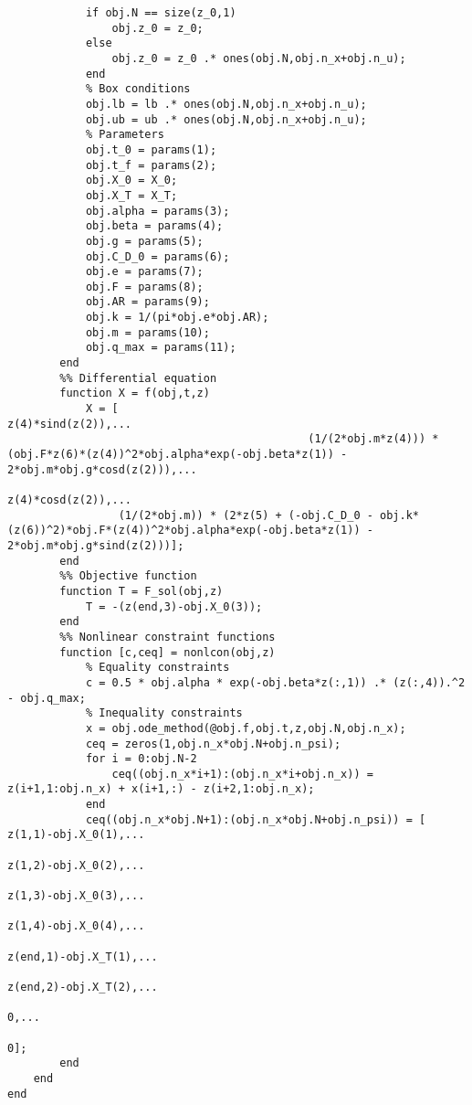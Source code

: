 \begin{lstlisting}[style=num_octave, caption={Matlab Programmcode von \texttt{maximalrangeflight.m}.}, label=code:direct_maximalrangeflight]
            % Start vector fmincon
            if obj.N == size(z_0,1)
                obj.z_0 = z_0;
            else
                obj.z_0 = z_0 .* ones(obj.N,obj.n_x+obj.n_u);
            end
            % Box conditions
            obj.lb = lb .* ones(obj.N,obj.n_x+obj.n_u);
            obj.ub = ub .* ones(obj.N,obj.n_x+obj.n_u);
            % Parameters
            obj.t_0 = params(1);
            obj.t_f = params(2);
            obj.X_0 = X_0;
            obj.X_T = X_T;
            obj.alpha = params(3);
            obj.beta = params(4);
            obj.g = params(5);
            obj.C_D_0 = params(6);
            obj.e = params(7);
            obj.F = params(8);
            obj.AR = params(9);
            obj.k = 1/(pi*obj.e*obj.AR);
            obj.m = params(10);
            obj.q_max = params(11);
        end
        %% Differential equation
        function X = f(obj,t,z)
            X = [                                                                                                                 z(4)*sind(z(2)),...
                                              (1/(2*obj.m*z(4))) * (obj.F*z(6)*(z(4))^2*obj.alpha*exp(-obj.beta*z(1)) - 2*obj.m*obj.g*cosd(z(2))),...
                                                                                                                                  z(4)*cosd(z(2)),...
                 (1/(2*obj.m)) * (2*z(5) + (-obj.C_D_0 - obj.k*(z(6))^2)*obj.F*(z(4))^2*obj.alpha*exp(-obj.beta*z(1)) - 2*obj.m*obj.g*sind(z(2)))];
        end
        %% Objective function
        function T = F_sol(obj,z)
            T = -(z(end,3)-obj.X_0(3));
        end
        %% Nonlinear constraint functions
        function [c,ceq] = nonlcon(obj,z)
            % Equality constraints
            c = 0.5 * obj.alpha * exp(-obj.beta*z(:,1)) .* (z(:,4)).^2 - obj.q_max; 
            % Inequality constraints
            x = obj.ode_method(@obj.f,obj.t,z,obj.N,obj.n_x);
            ceq = zeros(1,obj.n_x*obj.N+obj.n_psi);
            for i = 0:obj.N-2
                ceq((obj.n_x*i+1):(obj.n_x*i+obj.n_x)) = z(i+1,1:obj.n_x) + x(i+1,:) - z(i+2,1:obj.n_x);
            end
            ceq((obj.n_x*obj.N+1):(obj.n_x*obj.N+obj.n_psi)) = [  z(1,1)-obj.X_0(1),...
                                                                      z(1,2)-obj.X_0(2),...
                                                                      z(1,3)-obj.X_0(3),...
                                                                      z(1,4)-obj.X_0(4),...
                                                                    z(end,1)-obj.X_T(1),...
                                                                    z(end,2)-obj.X_T(2),...
                                                                                      0,...
                                                                                      0];
        end
    end
end
\end{lstlisting}

